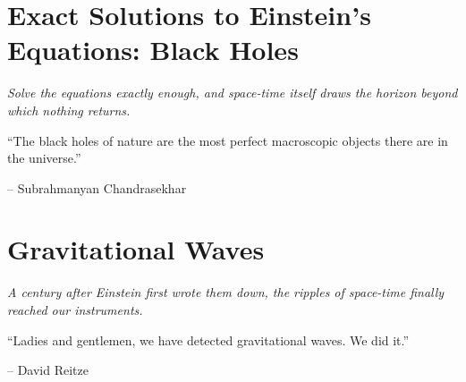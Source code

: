 \documentclass[english,11pt,twoside,openright]{book}
\begin{document}
	

	\chapter{Exact Solutions to Einstein's Equations: Black Holes}\label{chap:BlackHoles}
	\thispagestyle{empty}
	\vspace*{2cm}
	\begin{center}
		{\itshape\Huge Solve the equations exactly enough, and space-time itself draws the horizon beyond which nothing returns. \par}
		\vspace{1cm}
		\epigraph{``The black holes of nature are the most perfect macroscopic objects there are in the universe.''}{-- Subrahmanyan Chandrasekhar}
	\end{center}
	\clearpage

	

	\chapter{Gravitational Waves}\label{chap:GravWaves}
	\thispagestyle{empty}
	\vspace*{2cm}
	\begin{center}
		{\itshape\Huge A century after Einstein first wrote them down, the ripples of space-time finally reached our instruments. \par}
		\vspace{1cm}
		\epigraph{``Ladies and gentlemen, we have detected gravitational waves. We did it.''}{-- David Reitze}
	\end{center}
	\clearpage

	

    
	
\end{document}
